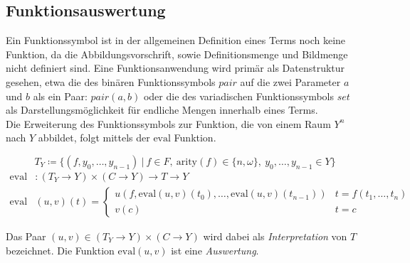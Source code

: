 \documentclass{article}
\begin{document}
\subsection{Funktionsauswertung}
Ein Funktionssymbol ist in der allgemeinen Definition eines Terms noch keine Funktion, da die Abbildungsvorschrift, sowie Definitionsmenge und Bildmenge nicht definiert sind. Eine Funktionsanwendung wird primär als Datenstruktur gesehen, etwa die des binären Funktionssymbols $pair$ auf die zwei Parameter $a$ und $b$ als ein Paar: $pair(a, b)$ oder die des variadischen Funktionssymbols $set$ als Darstellungsmöglichkeit für endliche Mengen innerhalb eines Terms.\\
Die Erweiterung des Funktionssymbols zur Funktion, die von einem Raum $Y^n$ nach $Y$ abbildet, folgt mittels der $\mathrm{eval}$ Funktion.

$$T_Y \coloneqq \{(f, y_0, \dots, y_{n-1})~|~f \in F,~\mathrm{arity}(f) \in \{n, \omega\},
~ y_0, \dots,y_{n-1} \in Y\}$$
\begin{equation*}
    \begin{split}
	\mathrm{eval} &\colon (T_Y \rightarrow Y) \times (C \rightarrow Y) \rightarrow T \rightarrow Y\\
	\mathrm{eval} &(u, v)(t) = \begin{cases}
		u(f, \mathrm{eval}(u, v)(t_0), \dots, \mathrm{eval}(u, v)(t_{n-1})) & t = f(t_1, \dots, t_n)\\
		v(c)                                                                                            & t = c
		\end{cases}
    \end{split}
\end{equation*}

Das Paar $(u, v) \in (T_Y \rightarrow Y) \times (C \rightarrow Y)$ wird dabei als \emph{Interpretation} von $T$ bezeichnet. Die Funktion $\mathrm{eval}(u, v)$ ist eine \emph{Auswertung}.
\\~\\
\end{document}
